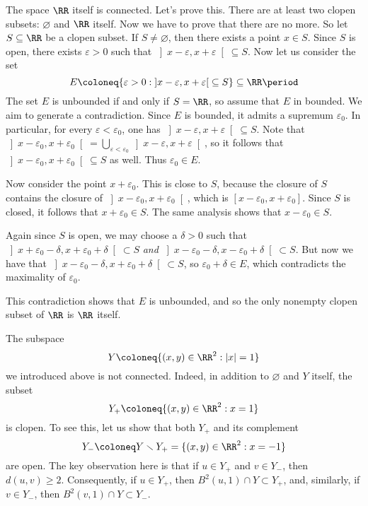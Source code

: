 \begin{exm}
	The space $\RR$ itself is connected.
	Let's prove this.
	There are at least two clopen subsets: $\varnothing$ and $\RR$ itself.
	Now we have to prove that there are no more.
	So let $S \subseteq \RR$ be a clopen subset.
	If $S \neq \varnothing$, then there exists a point $x \in S$.
	Since $S$ is open, there exists $\varepsilon >0$ such that $\left]x-\varepsilon, x+\varepsilon\right[ \subseteq S$.
	Now let us consider the set
	\[
		E \coloneq \{ \varepsilon >0 : \left]x-\varepsilon, x+\varepsilon\right[  \subseteq S \} \subseteq \RR \period
	\]
	The set $E$ is unbounded if and only if $S = \RR$, so assume that $E$ in bounded.
	We aim to generate a contradiction.
	Since $E$ is bounded, it admits a supremum $\varepsilon_0$.
	In particular, for every $\varepsilon < \varepsilon_0$, one has $\left]x-\varepsilon, x+\varepsilon\right[  \subseteq S$.
	Note that $\left]x-\varepsilon_0, x+\varepsilon_0\right[  = \bigcup_{\varepsilon < \varepsilon_0} \left]x-\varepsilon, x+\varepsilon\right[ $, so it follows that $\left]x-\varepsilon_0, x+\varepsilon_0\right[ \subseteq S$ as well.
	Thus $\varepsilon_0 \in E$.

	Now consider the point $x+\varepsilon_0$.
	This is close to $S$, because the closure of $S$ contains the closure of $\left]x-\varepsilon_0, x+\varepsilon_0\right[$, which is $[x-\varepsilon_0,x+\varepsilon_0]$. 
	Since $S$ is closed, it follows that $x +\varepsilon_0 \in S$.
	The same analysis shows that $x-\varepsilon_0 \in S$.

	Again since $S$ is open, we may choose a $\delta>0$ such that $\left]x+\varepsilon_0-\delta, x+\varepsilon_0+\delta\right[ \subset S$ \emph{and} $\left]x-\varepsilon_0-\delta, x-\varepsilon_0+\delta\right[ \subset S$.
	But now we have that $\left]x-\varepsilon_0-\delta, x+\varepsilon_0+\delta\right[ \subset S$, so $\varepsilon_0+\delta \in E$, which contradicts the maximality of $\varepsilon_0$.

	This contradiction shows that $E$ is unbounded, and so the only nonempty clopen subset of $\RR$ is $\RR$ itself.
\end{exm}

\begin{exm}
	The subspace
	\[
		Y \coloneq \{(x,y) \in \RR^2 : |x|=1 \}
	\]
	we introduced above is not connected.
	Indeed, in addition to $\varnothing $ and $Y$ itself, the subset
	\[
		Y_+ \coloneq \{(x,y) \in \RR^2 : x=1 \}
	\]
	is clopen.
	To see this, let us show that both $Y_+$ and its complement
	\[
		Y_- \coloneq Y \smallsetminus Y_+ = \{ (x,y) \in \RR^2 : x = -1 \}
	\]
	are open.
	The key observation here is that if $ u \in Y_+$ and $v \in Y_-$, then $d(u,v) \geq 2$.
	Consequently, if $u \in Y_+$, then $B^2(u,1) \cap Y \subset Y_+$, and, similarly, if $v \in Y_-$, then $B^2(v,1) \cap Y \subset Y_-$.
\end{exm}

